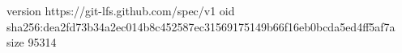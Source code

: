 version https://git-lfs.github.com/spec/v1
oid sha256:dea2fd73b34a2ec014b8c452587ec31569175149b66f16eb0bcda5ed4ff5af7a
size 95314
